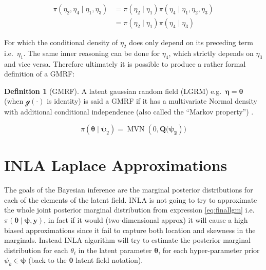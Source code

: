 \documentclass[
  12pt,
  a4paper,
  oneside]{book}
\theoremstyle{definition}
\newtheorem{definition}{Definition}[chapter]
\theoremstyle{definition}
\theoremstyle{definition}
\theoremstyle{remark}
\begin{document}
\begin{equation} 
\begin{split}
  \pi\left(\eta_{2}, \eta_{4} \mid \eta_{1}, \eta_{3}\right) &=\pi\left(\eta_{2} \mid \eta_{1}\right) \pi\left(\eta_{4} \mid \eta_{1}, \eta_{2}, \eta_{3}\right) \\
  & =\pi\left(\eta_{2} \mid \eta_{1}\right) \pi\left(\eta_{4} \mid \eta_{3}\right)
\end{split}
\label{eq:conditinal}
\end{equation}

For which the conditional density of \(\eta_2\) does only depend on its preceding term i.e.~\(\eta_1\). The same inner reasoning can be done for \(\eta_4\), which strictly depends on \(\eta_3\) and vice versa.
Therefore ultimately it is possible to produce a rather formal definition of a GMRF:

\begin{definition}[GMRF]
\protect\hypertarget{def:gmrf}{}{\label{def:gmrf} {} }A latent gaussian random field (LGRM) e.g.~\(\boldsymbol\eta = \boldsymbol\theta\) (when \(\mathscr{g}(\cdot)\) is identity) is said a GMRF if it has a multivariate Normal density with additional conditional independence (also called the ``Markov property'') \citep{wang2018bayesian}.
\end{definition}

\[
\pi(\boldsymbol{\theta} \mid \boldsymbol{\psi}_2) = \operatorname{MVN}(0, \boldsymbol{Q(\psi_2}))
\]

\hypertarget{approx}{%
\section{INLA Laplace Approximations}\label{approx}}

The goals of the Bayesian inference are the marginal posterior distributions for each of the elements of the latent field. INLA is not going to try to approximate the whole joint posterior marginal distribution from expression \eqref{eq:finallgm} i.e.~\(\pi(\boldsymbol{\theta} \mid \boldsymbol{\psi}, \boldsymbol{\mathbf{y}})\), in fact if it would (two-dimensional approx) it will cause a high biased approximations since it fail to capture both location and skewness in the marginals. Instead INLA algorithm will try to estimate the posterior marginal distribution for each \(\theta_{i}\) in the latent parameter \(\boldsymbol{\theta}\), for each hyper-parameter prior \(\psi_{k} \in \boldsymbol\psi\) (back to the \(\boldsymbol\theta\) latent field notation).
\end{document}
